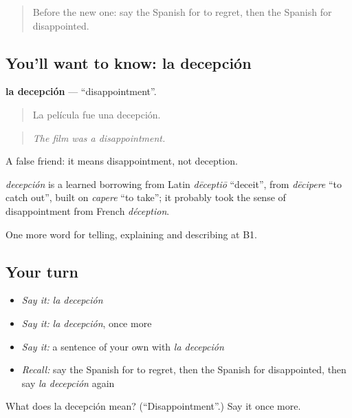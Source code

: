 \label{lesson:ES-C716-decepcion}



\begin{quote}
Before the new one: say the Spanish for to regret, then the Spanish for disappointed.
\end{quote}

\subsection*{You'll want to know: la decepción}
\textbf{la decepción} — \textquotedblleft{}disappointment\textquotedblright{}.

\begin{quote}
La película fue una decepción.
\end{quote}

\begin{quote}
\emph{The film was a disappointment.}
\end{quote}

A false friend: it means disappointment, not deception.

\begin{cousinweb}
\emph{decepción} is a learned borrowing from Latin \emph{dēceptiō} \textquotedblleft{}deceit\textquotedblright{}, from \emph{dēcipere} \textquotedblleft{}to catch out\textquotedblright{}, built on \emph{capere} \textquotedblleft{}to take\textquotedblright{}; it probably took the sense of disappointment from French \emph{déception}.
\end{cousinweb}

\begin{grammarlens}[title={What you've built}]
One more word for telling, explaining and describing at B1.
\end{grammarlens}

\subsection*{Your turn}
\begin{itemize}
\raggedright
  \item \emph{Say it:} \emph{la decepción}
  \item \emph{Say it:} \emph{la decepción}, once more
  \item \emph{Say it:} a sentence of your own with \emph{la decepción}
  \item \emph{Recall:} say the Spanish for to regret, then the Spanish for disappointed, then say \emph{la decepción} again
\end{itemize}

\begin{tcolorbox}[breakable,colback=teal!4,colframe=teal!35!black,title={Before you move on}]
What does la decepción mean? (\textquotedblleft{}Disappointment\textquotedblright{}.) Say it once more.
\end{tcolorbox}
